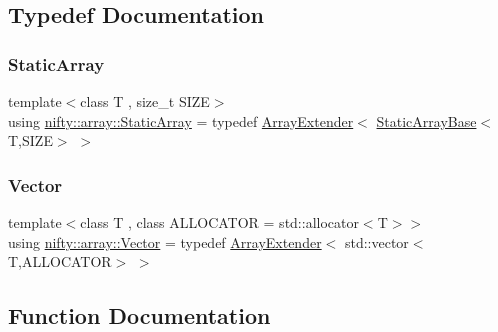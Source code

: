 \subsection{Typedef Documentation}
\mbox{\label{namespacenifty_1_1array_a683f151f19c851754e0c6d55ed16a0c2}} 
\subsubsection{\texorpdfstring{Static\+Array}{StaticArray}}
{\footnotesize\ttfamily template$<$class T , size\+\_\+t S\+I\+ZE$>$ \\
using \hyperlink{namespacenifty_1_1array_a683f151f19c851754e0c6d55ed16a0c2}{nifty\+::array\+::\+Static\+Array} = typedef \hyperlink{classnifty_1_1array_1_1ArrayExtender}{Array\+Extender}$<$ \hyperlink{classnifty_1_1array_1_1StaticArrayBase}{Static\+Array\+Base}$<$T,S\+I\+ZE$>$ $>$}

\mbox{\label{namespacenifty_1_1array_aa0fe9e5e97322da484fa8ffd2fe44cd5}} 
\subsubsection{\texorpdfstring{Vector}{Vector}}
{\footnotesize\ttfamily template$<$class T , class A\+L\+L\+O\+C\+A\+T\+OR  = std\+::allocator$<$\+T$>$$>$ \\
using \hyperlink{namespacenifty_1_1array_aa0fe9e5e97322da484fa8ffd2fe44cd5}{nifty\+::array\+::\+Vector} = typedef \hyperlink{classnifty_1_1array_1_1ArrayExtender}{Array\+Extender}$<$ std\+::vector$<$T,A\+L\+L\+O\+C\+A\+T\+OR$>$ $>$}



\subsection{Function Documentation}
\mbox{\label{namespacenifty_1_1array_adacdae329fa7ea377154bbc41717f86f}} 
